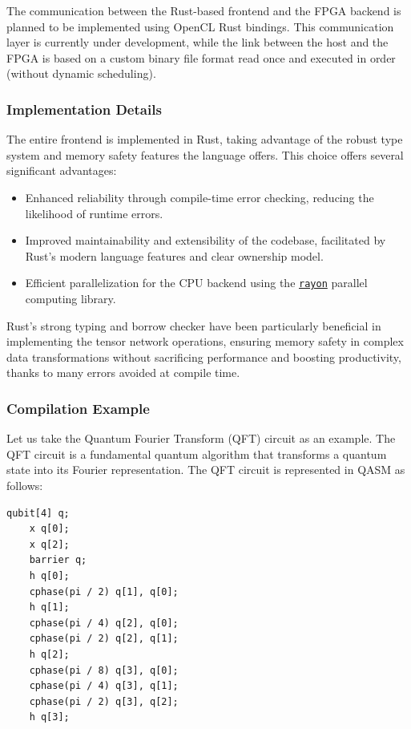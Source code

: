 \documentclass[12pt,oneside,a4paper]{article}
\begin{document}
The communication between the Rust-based frontend and the FPGA backend is planned to be implemented using OpenCL Rust bindings. This communication layer is currently under development, while the link between the host and the FPGA is based on a custom binary file format read once and executed in order (without dynamic scheduling).

\subsubsection{Implementation Details}

The entire frontend is implemented in Rust, taking advantage of the robust type system and memory safety features the language offers. This choice offers several significant advantages:

\begin{itemize}
    \item Enhanced reliability through compile-time error checking, reducing the likelihood of runtime errors.
    \item Improved maintainability and extensibility of the codebase, facilitated by Rust's modern language features and clear ownership model.
    \item Efficient parallelization for the CPU backend using the \href{https://github.com/rayon-rs/rayon}{\texttt{rayon}} parallel computing library.
\end{itemize}

Rust's strong typing and borrow checker have been particularly beneficial in implementing the tensor network operations, ensuring memory safety in complex data transformations without sacrificing performance and boosting productivity, thanks to many errors avoided at compile time.

\subsubsection{Compilation Example}

Let us take the Quantum Fourier Transform (QFT)\cite{coppersmith2002approximatefouriertransformuseful} circuit as an example. The QFT circuit is a fundamental quantum algorithm that transforms a quantum state into its Fourier representation. The QFT circuit is represented in QASM as follows:

\begin{lstlisting}[style=qasm, caption={QFT Circuit in QASM}]
	qubit[4] q;
	x q[0];
	x q[2];
	barrier q;
	h q[0];
	cphase(pi / 2) q[1], q[0];
	h q[1];
	cphase(pi / 4) q[2], q[0];
	cphase(pi / 2) q[2], q[1];
	h q[2];
	cphase(pi / 8) q[3], q[0];
	cphase(pi / 4) q[3], q[1];
	cphase(pi / 2) q[3], q[2];
	h q[3];
\end{lstlisting}
\end{document}
